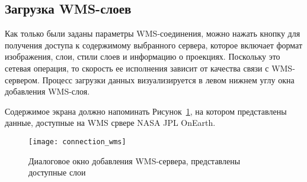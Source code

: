 
\subsection{Загрузка WMS-слоев}\label{sec:ogc-wms-layers}

Как только были заданы параметры WMS-соединения, можно нажать кнопку
 для получения доступа к содержимому выбранного
сервера, которое включает формат изображения, слои, стили слоев и
информацию о проекциях. Поскольку это сетевая операция, то скорость ее
исполнения зависит от качества связи с WMS-сервером. Процесс загрузки
данных визуализируется в левом нижнем углу окна добавления WMS-слоя.

Содержимое экрана должно напоминать Рисунок~\ref{fig:connection_wms}, на
котором представлены данные, доступные на WMS срвере NASA JPL OnEarth.

\begin{figure}[ht]
  \centering
  \texttt{[image: connection\_wms]}
  \caption{Диалоговое окно добавления WMS-сервера, представлены доступные слои
  \nixcaption}\label{fig:connection_wms}
\end{figure}

